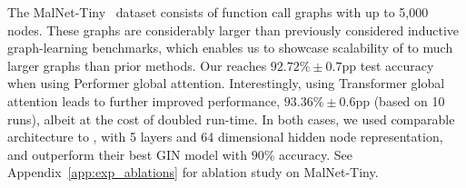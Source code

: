 \documentclass{article}
\begin{document}
The MalNet-Tiny~\cite{freitas2021malnet} dataset consists of function call graphs with up to 5,000 nodes. These graphs are considerably larger than previously considered inductive graph-learning benchmarks, which enables us to showcase scalability of \method to much larger graphs than prior methods. Our \method reaches $92.72\% \pm 0.7\mathrm{pp}$ test accuracy when using Performer global attention. Interestingly, using Transformer global attention leads to further improved \method performance, $93.36\% \pm 0.6\mathrm{pp}$ (based on 10 runs), albeit at the cost of doubled run-time. In both cases, we used comparable architecture to \citet{freitas2021malnet}, with 5 layers and 64 dimensional hidden node representation, and outperform their best GIN model with $90\%$ accuracy. See Appendix~\ref{app:exp_ablations} for \method ablation study on MalNet-Tiny.
\end{document}
